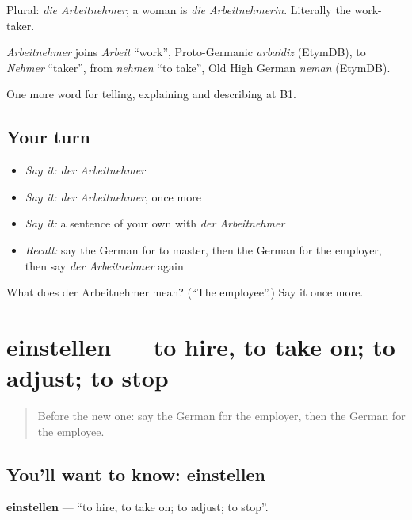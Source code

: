 Plural: \emph{die Arbeitnehmer}; a woman is \emph{die Arbeitnehmerin}. Literally the work-taker.

\begin{cousinweb}
\emph{Arbeitnehmer} joins \emph{Arbeit} \textquotedblleft{}work\textquotedblright{}, Proto-Germanic \emph{arbaidiz} (EtymDB), to \emph{Nehmer} \textquotedblleft{}taker\textquotedblright{}, from \emph{nehmen} \textquotedblleft{}to take\textquotedblright{}, Old High German \emph{neman} (EtymDB).
\end{cousinweb}

\begin{grammarlens}[title={What you've built}]
One more word for telling, explaining and describing at B1.
\end{grammarlens}

\subsection*{Your turn}
\begin{itemize}
\raggedright
  \item \emph{Say it:} \emph{der Arbeitnehmer}
  \item \emph{Say it:} \emph{der Arbeitnehmer}, once more
  \item \emph{Say it:} a sentence of your own with \emph{der Arbeitnehmer}
  \item \emph{Recall:} say the German for to master, then the German for the employer, then say \emph{der Arbeitnehmer} again
\end{itemize}

\begin{tcolorbox}[breakable,colback=teal!4,colframe=teal!35!black,title={Before you move on}]
What does der Arbeitnehmer mean? (\textquotedblleft{}The employee\textquotedblright{}.) Say it once more.
\end{tcolorbox}
\section[einstellen]{einstellen — to hire, to take on; to adjust; to stop}

\label{lesson:GE-C350-einstellen}



\begin{quote}
Before the new one: say the German for the employer, then the German for the employee.
\end{quote}

\subsection*{You'll want to know: einstellen}
\textbf{einstellen} — \textquotedblleft{}to hire, to take on; to adjust; to stop\textquotedblright{}.

